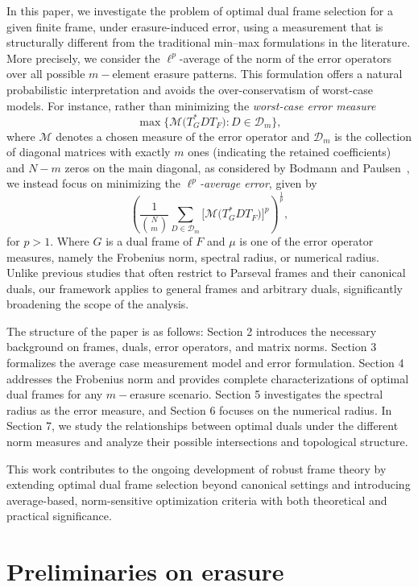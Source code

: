 \documentclass[final,1p,times]{elsarticle}
\begin{document}
\par In this paper, we investigate the problem of optimal dual frame selection for a given finite frame, under erasure-induced error, using a measurement that is structurally different from the traditional min–max formulations in the literature. More precisely, we consider the 
$\ell^p$-average of the norm of the error operators over all possible $m-$element erasure patterns. This formulation offers a natural probabilistic interpretation and avoids the over-conservatism of worst-case models. For instance,  rather than minimizing the \emph{worst-case error measure}
\[
\max \bigg\{ \mathcal{M}\big( T_G^* D T_F \big) : D \in \mathcal{D}_m \bigg\},
\]
where $\mathcal{M}$ denotes a chosen measure of the error operator and 
$\mathcal{D}_m$ is the collection of diagonal matrices with exactly $m$ ones 
(indicating the retained coefficients) and $N-m$ zeros on the main diagonal, as considered by Bodmann and Paulsen~\cite{bodm1}, 
we instead focus on minimizing the \emph{$\ell^p$-average error}, given by
\[
\left( \frac{1}{\binom{N}{m}} \sum_{D \in \mathcal{D}_m} 
\big[ \mathcal{M} \big( T_G^* D T_F \big) \big]^p \right)^{\!\frac{1}{p}},
\]
for $p>1$. Where $G$ is a dual frame of $F$ and $\mu$ is one of the error operator measures, namely the Frobenius norm, spectral radius, or numerical radius. Unlike previous studies that often restrict to Parseval frames and their canonical duals, our framework applies to general frames and arbitrary duals, significantly broadening the scope of the analysis.

The structure of the paper is as follows: Section 2 introduces the necessary background on frames, duals, error operators, and matrix norms. Section 3 formalizes the average case measurement model and error formulation. Section 4 addresses the Frobenius norm and provides complete characterizations of optimal dual frames for any $m-$erasure scenario. Section 5 investigates the spectral radius as the error measure, and Section 6 focuses on the numerical radius. In Section 7, we study the relationships between optimal duals under the different norm measures and analyze their possible intersections and topological structure.

This work contributes to the ongoing development of robust frame theory by extending optimal dual frame selection beyond canonical settings and introducing average-based, norm-sensitive optimization criteria with both theoretical and practical significance.
	
	\section{Preliminaries on erasure }
	
\end{document}
